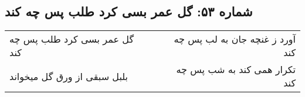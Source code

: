\begin{center}
\section*{شماره ۵۳: گل عمر بسی کرد طلب پس چه کند}
\label{sec:053}
\begin{longtable}{l p{0.5cm} r}
گل عمر بسی کرد طلب پس چه کند
&&
آورد ز غنچه جان به لب پس چه کند
\\
بلبل سبقی از ورق گل میخواند
&&
تکرار همی کند به شب پس چه کند
\\
\end{longtable}
\end{center}
